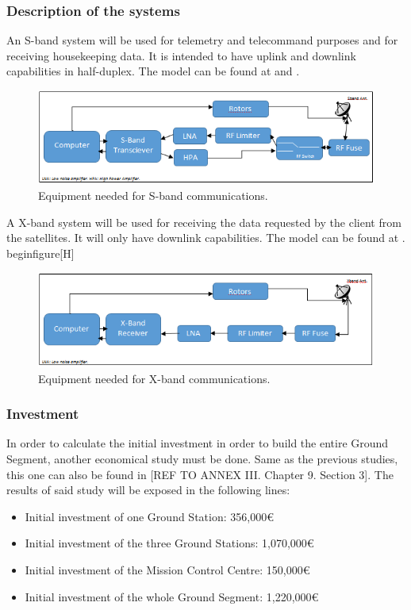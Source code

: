 \subsubsection{Description of the systems}
An S-band system will be used for telemetry and telecommand purposes and for receiving housekeeping data. It is intended to have uplink and downlink capabilities in half-duplex. The model can be found at \cite{SBand} and \cite{SBandDatasheet}.
\begin{figure}[H]
\begin{center}
\includegraphics[scale=1]{SbandEquip.PNG}
\caption[S-band Equipment]{Equipment needed for S-band communications.}
\label{fig:SbandEquip}
\end{center}
\end{figure}

A X-band system will be used for receiving the data requested by the client from the satellites. It will only have downlink capabilities. The model can be found at \cite{XBand}.
begin{figure}[H]
\begin{figure}[H]
\begin{center}
\includegraphics[scale=1]{XbandEquip.PNG}
\caption[X-band Equipment]{Equipment needed for X-band communications.}
\label{fig:XbandEquip}
\end{center}
\end{figure}

\subsubsection{Investment}
In order to calculate the initial investment in order to build the entire Ground Segment, another economical study must be done. Same as the previous studies, this one can also be found in [{REF TO ANNEX III. Chapter 9. Section 3}]. The results of said study will be exposed in the following lines:

\begin{itemize}
\item Initial investment of one Ground Station: 356,000\euro
\item Initial investment of the three Ground Stations: 1,070,000\euro
\item Initial investment of the Mission Control Centre: 150,000\euro
\item Initial investment of the whole Ground Segment: 1,220,000\euro
\end{itemize}